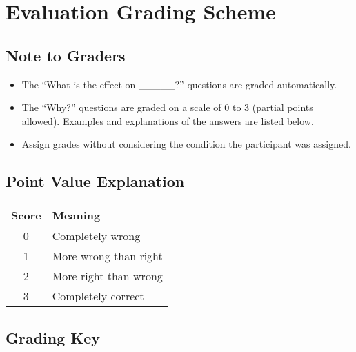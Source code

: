 \chapter{Evaluation Grading Scheme}

\section{Note to Graders}

\begin{itemize}
\item The ``What is the effect on \_\_\_\_\_?'' questions are graded automatically.
\item The ``Why?'' questions are graded on a scale of 0 to 3 (partial points allowed).  Examples and explanations of the answers are listed below.
\item Assign grades without considering the condition the participant was assigned. 
\end{itemize}

\section{Point Value Explanation}

\begin{tabular}{| c | l |} \hline
\rowcolor{gray!35} \textbf{Score} & \textbf{Meaning} \\ \hline
0 & Completely wrong \\ 
1 & More wrong than right \\ 
2 & More right than wrong \\ 
3 & Completely correct \\
\hline
\end{tabular}


\clearpage

\section{Grading Key}

